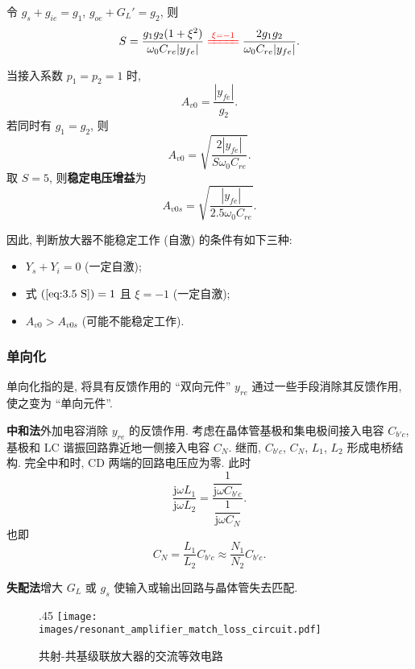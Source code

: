 令 $g_s+g_{ie}=g_1$, $g_{oe}+G_L'=g_2$, 则
\begin{equation}
    S=\frac{g_1g_2(1+\xi^2)}{\omega_0C_{re}|y_{fe}|}\xlongequal{\color{red} \xi=-1}\frac{2g_1g_2}{\omega_0C_{re}|y_{fe}|}.
\end{equation}

当接入系数 $p_1=p_2=1$ 时,
\begin{equation}
    A_{v0}=\frac{|y_{fe}|}{g_2}.
\end{equation}
若同时有 $g_1=g_2$, 则
\begin{equation}
    A_{v0}=\sqrt{\frac{2|y_{fe}|}{S\omega_0C_{re}}}.
\end{equation}
取 $S=5$, 则\textbf{稳定电压增益}为
\begin{equation}
    A_{v0s}=\sqrt{\frac{|y_{fe}|}{2.5\omega_0C_{re}}}.
\end{equation}

\noindent\hrulefill

因此, 判断放大器不能稳定工作 (自激) 的条件有如下三种:
\begin{itemize}
    \item $Y_s+Y_i=0$ (一定自激);
    \item 式 $(\ref{eq:3.5 S})=1$ 且 $\xi=-1$ (一定自激);
    \item $A_{v0}>A_{v0s}$ (可能不能稳定工作).
\end{itemize}

\subsubsection{单向化}
单向化指的是, 将具有反馈作用的 ``双向元件'' $y_{re}$ 通过一些手段消除其反馈作用, 使之变为 ``单向元件''.

\textbf{中和法}\quad 外加电容消除 $y_{re}$ 的反馈作用.
考虑在晶体管基极和集电极间接入电容 $C_{b'c}$, 基极和 LC 谐振回路靠近地一侧接入电容 $C_N$. 继而, $C_{b'c}$, $C_N$, $L_1$, $L_2$ 形成电桥结构. 完全中和时, CD 两端的回路电压应为零. 此时
\begin{equation}
    \frac{\mathrm{j}\omega L_1}{\mathrm{j}\omega L_2}=\frac{\dfrac{1}{\mathrm{j}\omega C_{b'c}}}{\dfrac{1}{\mathrm{j}\omega C_N}}.
\end{equation}
也即
\begin{equation}
    C_N=\frac{L_1}{L_2}C_{b'c}\approx\frac{N_1}{N_2}C_{b'c}.
\end{equation}

\textbf{失配法}\quad 增大 $G_L$ 或 $g_s$ 使输入或输出回路与晶体管失去匹配.

\begin{wrapfigure}{.45\textwidth}
    \centering
    \texttt{[image: images/resonant\_amplifier\_match\_loss\_circuit.pdf]}
    \caption{共射-共基级联放大器的交流等效电路}
\end{wrapfigure}

